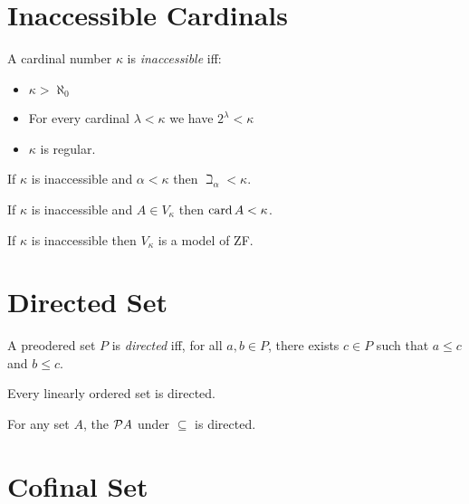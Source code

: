\section{Inaccessible Cardinals}

\begin{definition}[Inaccessible]
    A cardinal number $\kappa$ is \emph{inaccessible}
    iff:
    \begin{itemize}
        \item $\kappa > \aleph_0$
        \item For every cardinal $\lambda < \kappa$ we have $2^\lambda < \kappa$
        \item $\kappa$ is regular.   
    \end{itemize}
\end{definition}

\begin{lemma}
    If $\kappa$ is inaccessible and $\alpha < \kappa$ then $\beth_\alpha < \kappa$.
\end{lemma}

\begin{lemma}
    If $\kappa$ is inaccessible and $A \in V_\kappa$ then $\operatorname{card} A < \kappa$.
\end{lemma}

\begin{theorem}
    If $\kappa$ is inaccessible then $V_\kappa$ is a model of ZF.
\end{theorem}

\section{Directed Set}

\begin{definition}
    A preodered set $P$ is \emph{directed} iff, for all $a, b \in P$,
    there exists $c \in P$ such that $a \leq c$ and $b \leq c$.
\end{definition}

\begin{proposition}
    Every linearly ordered set is directed.
\end{proposition}

\begin{proposition}
    For any set $A$, the $\mathcal{P} A$ under $\subseteq$ is directed.
\end{proposition}

\section{Cofinal Set}

